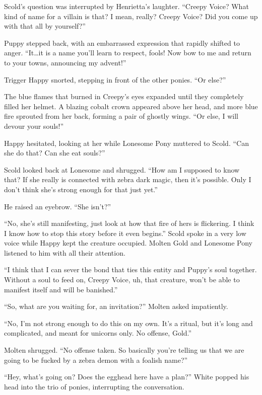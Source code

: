 Scold's question was interrupted by Henrietta's laughter. ``Creepy Voice? What kind of name for a villain is that? I mean, really? Creepy Voice? Did you come up with that all by yourself?''

Puppy stepped back, with an embarrassed expression that rapidly shifted to anger. ``It\dots it is a name you'll learn to respect, fools! Now bow to me and return to your towns, announcing my advent!''

Trigger Happy snorted, stepping in front of the other ponies. ``Or else?''

The blue flames that burned in Creepy's eyes expanded until they completely filled her helmet. A blazing cobalt crown appeared above her head, and more blue fire sprouted from her back, forming a pair of ghostly wings. ``Or else, I will devour your souls!''

Happy hesitated, looking at her while Lonesome Pony muttered to Scold. ``Can she do that? Can she eat souls?''

Scold looked back at Lonesome and shrugged. ``How am I supposed to know that? If she really is connected with zebra dark magic, then it's possible. Only I don't think she's strong enough for that just yet.''

He raised an eyebrow. ``She isn't?''

``No, she's still manifesting, just look at how that fire of hers is flickering. I think I know how to stop this story before it even begins.'' Scold spoke in a very low voice while Happy kept the creature occupied. Molten Gold and Lonesome Pony listened to him with all their attention.

``I think that I can sever the bond that ties this entity and Puppy's soul together. Without a soul to feed on, Creepy Voice, uh, that creature, won't be able to manifest itself and will be banished.''

``So, what are you waiting for, an invitation?'' Molten asked impatiently.

``No, I'm not strong enough to do this on my own. It's a ritual, but it's long and complicated, and meant for unicorns only. No offense, Gold.''

Molten shrugged. ``No offense taken. So basically you're telling us that we are going to be fucked by a zebra demon with a foalish name?''

``Hey, what's going on? Does the egghead here have a plan?'' White popped his head into the trio of ponies, interrupting the conversation.

